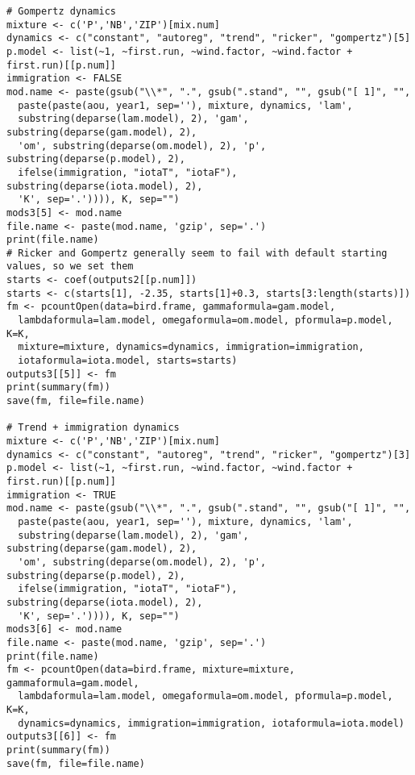\documentclass[12pt]{article}
\begin{document}
\begin{verbatim}
# Gompertz dynamics
mixture <- c('P','NB','ZIP')[mix.num]
dynamics <- c("constant", "autoreg", "trend", "ricker", "gompertz")[5]
p.model <- list(~1, ~first.run, ~wind.factor, ~wind.factor + first.run)[[p.num]]
immigration <- FALSE
mod.name <- paste(gsub("\\*", ".", gsub(".stand", "", gsub("[ 1]", "", 
  paste(paste(aou, year1, sep=''), mixture, dynamics, 'lam', 
  substring(deparse(lam.model), 2), 'gam', substring(deparse(gam.model), 2), 
  'om', substring(deparse(om.model), 2), 'p', substring(deparse(p.model), 2), 
  ifelse(immigration, "iotaT", "iotaF"), substring(deparse(iota.model), 2),
  'K', sep='.')))), K, sep="")
mods3[5] <- mod.name
file.name <- paste(mod.name, 'gzip', sep='.')
print(file.name)
# Ricker and Gompertz generally seem to fail with default starting values, so we set them
starts <- coef(outputs2[[p.num]])
starts <- c(starts[1], -2.35, starts[1]+0.3, starts[3:length(starts)])
fm <- pcountOpen(data=bird.frame, gammaformula=gam.model, 
  lambdaformula=lam.model, omegaformula=om.model, pformula=p.model, K=K, 
  mixture=mixture, dynamics=dynamics, immigration=immigration, 
  iotaformula=iota.model, starts=starts)
outputs3[[5]] <- fm
print(summary(fm))
save(fm, file=file.name)

# Trend + immigration dynamics
mixture <- c('P','NB','ZIP')[mix.num]
dynamics <- c("constant", "autoreg", "trend", "ricker", "gompertz")[3]
p.model <- list(~1, ~first.run, ~wind.factor, ~wind.factor + first.run)[[p.num]]
immigration <- TRUE
mod.name <- paste(gsub("\\*", ".", gsub(".stand", "", gsub("[ 1]", "", 
  paste(paste(aou, year1, sep=''), mixture, dynamics, 'lam', 
  substring(deparse(lam.model), 2), 'gam', substring(deparse(gam.model), 2), 
  'om', substring(deparse(om.model), 2), 'p', substring(deparse(p.model), 2), 
  ifelse(immigration, "iotaT", "iotaF"), substring(deparse(iota.model), 2),
  'K', sep='.')))), K, sep="")
mods3[6] <- mod.name
file.name <- paste(mod.name, 'gzip', sep='.')
print(file.name)
fm <- pcountOpen(data=bird.frame, mixture=mixture, gammaformula=gam.model, 
  lambdaformula=lam.model, omegaformula=om.model, pformula=p.model, K=K, 
  dynamics=dynamics, immigration=immigration, iotaformula=iota.model)
outputs3[[6]] <- fm
print(summary(fm))
save(fm, file=file.name)


\end{verbatim}
\end{document}
